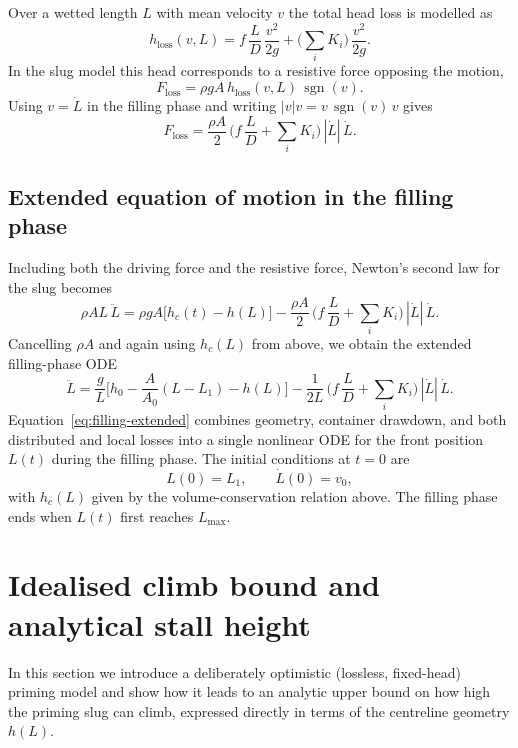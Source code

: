 \documentclass[11pt]{article}
\begin{document}
Over a wetted length $L$ with mean velocity $v$ the total head loss is modelled as
\[
  h_{\text{loss}}(v,L)
  = f\,\frac{L}{D}\,\frac{v^2}{2g}
    + \Big(\sum_i K_i\Big)\,\frac{v^2}{2g}.
\]
In the slug model this head corresponds to a resistive force opposing the motion,
\[
  F_{\text{loss}} = \rho g A\,h_{\text{loss}}(v,L)\,\operatorname{sgn}(v).
\]
Using $v = \dot L$ in the filling phase and writing $|v|v = v\,\operatorname{sgn}(v)\,v$ gives
\[
  F_{\text{loss}} = \frac{\rho A}{2}\,\Big(f\,\frac{L}{D} + \sum_i K_i\Big)\,|\dot L|\,\dot L.
\]

\subsection{Extended equation of motion in the filling phase}

Including both the driving force and the resistive force, Newton's second law for the slug
becomes
\begin{equation}
  \rho A L\,\ddot L
  = \rho g A\bigl[h_c(t) - h(L)\bigr]
    - \frac{\rho A}{2}\,\Big(f\,\frac{L}{D} + \sum_i K_i\Big)\,|\dot L|\,\dot L.
  \label{eq:filling-extended-raw}
\end{equation}
Cancelling $\rho A$ and again using $h_c(L)$ from above, we obtain the extended filling-phase
ODE
\begin{equation}
  \ddot L
  = \frac{g}{L}\Big[h_0 - \frac{A}{A_0}(L - L_1) - h(L)\Big]
    - \frac{1}{2L}\,\Big(f\,\frac{L}{D} + \sum_i K_i\Big)\,|\dot L|\,\dot L.
  \label{eq:filling-extended}
\end{equation}
Equation~\eqref{eq:filling-extended} combines geometry, container drawdown, and both distributed and local
losses into a single nonlinear ODE for the front position $L(t)$ during the filling phase.
The initial conditions at $t = 0$ are
\[
  L(0) = L_1,\qquad \dot L(0) = v_0,
\]
with $h_c(L)$ given by the volume-conservation relation above. The filling phase ends when
$L(t)$ first reaches $L_{\max}$.

\section{Idealised climb bound and analytical stall height}
\label{sec:bound}

In this section we introduce a deliberately optimistic (lossless, fixed-head) priming model
and show how it leads to an analytic upper bound on how high the priming slug can climb,
expressed directly in terms of the centreline geometry $h(L)$.
\end{document}
